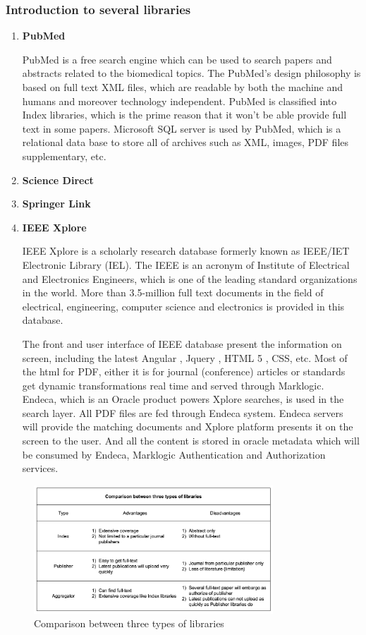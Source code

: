 \subsubsection{Introduction to several libraries }
\begin{enumerate}
	\item\textbf{PubMed}
		
	 PubMed is a free search engine which can be used to search papers and abstracts related to the biomedical topics. The PubMed’s design philosophy is based on full text XML files, which are readable by both the machine and humans and moreover technology independent. PubMed is classified into Index libraries, which is the prime reason that it won’t be able provide full text in some papers. Microsoft SQL server is used by PubMed, which is a relational data base to store all of archives such as XML, images, PDF files supplementary, etc.
	
	\item\textbf{Science Direct}
	\item\textbf{Springer Link}
	\item\textbf{IEEE Xplore}
	
	IEEE Xplore is a scholarly research database formerly known as IEEE/IET Electronic Library (IEL). The IEEE is an acronym of Institute of Electrical and Electronics Engineers, which is one of the leading standard organizations in the world. More than 3.5-million full text documents in the field of electrical, engineering, computer science and electronics is provided in this database. 
	
	The front and user interface of IEEE database present the information on screen, including the latest Angular , Jquery , HTML 5 , CSS, etc. Most of the html for PDF, either it is for journal (conference) articles or standards get dynamic transformations real time and served through Marklogic. Endeca, which is an Oracle product powers Xplore searches, is used in the search layer. All PDF files are fed through Endeca system. Endeca servers will provide the matching documents and Xplore platform presents it on the screen to the user. And all the content is stored in oracle metadata which will be consumed by Endeca, Marklogic Authentication and Authorization services.
	
\end{enumerate}

\begin{figure}[htb]
	\begin{center}
		\includegraphics[width=0.8\textwidth]{WolverineChart3}
	\end{center}
	\caption{Comparison between three types of libraries}
\end{figure}
\newpage
